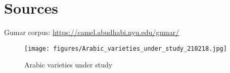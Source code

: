 \documentclass[output=paper]{langsci/langscibook}
\begin{document}

\section*{Sources}

Gumar corpus: \url{https://camel.abudhabi.nyu.edu/gumar/}

\begin{figure}[!h]
    \captionsetup{name=Map}
    \texttt{[image: figures/Arabic\_varieties\_under\_study\_210218.jpg]}
    \caption{Arabic varieties under study}
    \label{fig:ArabicVarieties}
\end{figure}



{\sloppy\printbibliography[heading=subbibliography,notkeyword=this]}
\end{document}
